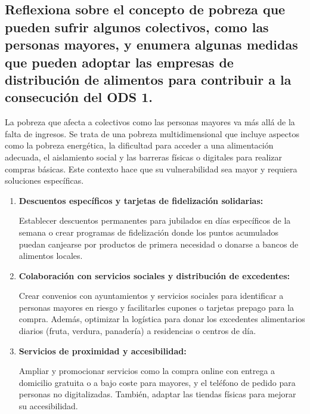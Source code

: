 
\fsection{\boldit{\textcolor{waveBlue2}{Actividades}}} 
\subsection*{Reflexiona sobre el concepto de pobreza que pueden sufrir algunos colectivos, como las personas mayores, y enumera algunas medidas que pueden adoptar las empresas de distribución de alimentos para contribuir a la consecución del ODS 1.}

\begin{solution}
La pobreza que afecta a colectivos como las personas mayores va más allá de la falta de ingresos. Se trata de una pobreza multidimensional 
que incluye aspectos como la pobreza energética, la dificultad para acceder a una alimentación adecuada, el aislamiento social y las barreras 
físicas o digitales para realizar compras básicas. Este contexto hace que su vulnerabilidad sea mayor y requiera soluciones específicas.

	\begin{enumerate}[label=\alph*)]
		\item\textbf{Descuentos específicos y tarjetas de fidelización solidarias:} 

			Establecer descuentos permanentes para jubilados en días específicos de la semana o crear programas de fidelización donde los puntos acumulados 
			puedan canjearse por productos de primera necesidad o donarse a bancos de alimentos locales.
		

		\item\textbf{Colaboración con servicios sociales y distribución de excedentes:} 

			Crear convenios con ayuntamientos y servicios sociales para identificar a personas mayores en riesgo y facilitarles cupones o tarjetas prepago para la compra. 
			Además, optimizar la logística para donar los excedentes alimentarios diarios (fruta, verdura, panadería) a residencias o centros de día.


		\item\textbf{Servicios de proximidad y accesibilidad:} 

			Ampliar y promocionar servicios como la compra online con entrega a domicilio gratuita o a bajo coste para mayores, 
			y el teléfono de pedido para personas no digitalizadas. También, adaptar las tiendas físicas para mejorar su accesibilidad.
	\end{enumerate}


\end{solution}

